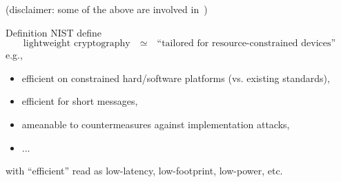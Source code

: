 \documentclass[9pt]{beamer}
\begin{document}

\begin{frame}
\titlepage

\centerline{(disclaimer: some of the above are involved in~\cite{NIST:LWC:sparkle})}
\end{frame}


\begin{frame}

\begin{block}{Definition}
NIST define~\cite[Section 3.4]{NIST:LWC:call}
\[
\mbox{lightweight cryptography ~~$\simeq$~~ ``tailored for resource-constrained devices''}
\]
e.g.,

\begin{itemize}
\item efficient on constrained hard/software platforms (vs. existing standards),
\item efficient for short messages,
\item ameanable to countermeasures against implementation attacks,
\item ...
\end{itemize}

\noindent
with ``efficient'' read as low-latency, low-footprint, low-power, etc.
\end{block}

\end{frame}
\end{document}
